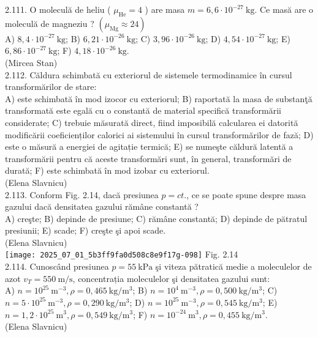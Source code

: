 2.111. O moleculă de heliu ( $\mu_{\mathrm{He}}=4$ ) are masa $m=6,6 \cdot 10^{-27} \mathrm{~kg}$. Ce masă are o moleculă de magneziu ? $\left(\mu_{\mathrm{Mg}} \approx 24\right)$\\ A) $8,4 \cdot 10^{-27} \mathrm{~kg}$; B) $6,21 \cdot 10^{-26} \mathrm{~kg}$; C) $3,96 \cdot 10^{-26} \mathrm{~kg}$; D) $4,54 \cdot 10^{-27} \mathrm{~kg}$; E) $6,86 \cdot 10^{-27} \mathrm{~kg}$; F) $4,18 \cdot 10^{-26} \mathrm{~kg}$.\\ (Mircea Stan)\\

2.112. Căldura schimbată cu exteriorul de sistemele termodinamice în cursul transformărilor de stare:\\ A) este schimbată în mod izocor cu exteriorul; B) raportată la masa de substanţă transformată este egală cu o constantă de material specifică transformării considerate; C) trebuie măsurată direct, fiind imposibilă calcularea ei datorită modificării coeficienților calorici ai sistemului în cursul transformărilor de fază; D) este o măsură a energiei de agitație termică; E) se numeşte căldură latentă a transformării pentru că aceste transformări sunt, în general, transformări de durată; F) este schimbată în mod izobar cu exteriorul.\\ (Elena Slavnicu)\\

2.113. Conform Fig. 2.14, dacă presiunea $p=ct.$, ce se poate spune despre masa gazului dacă densitatea gazului rămâne constantă ?\\ A) creşte; B) depinde de presiune; C) rămâne constantă; D) depinde de pătratul presiunii; E) scade; F) creşte şi apoi scade.\\ (Elena Slavnicu)\\ \texttt{[image: 2025\_07\_01\_5b3ff9fa0d508c8e9f17g-098]} Fig. 2.14\\

2.114. Cunoscând presiunea $p=55 \mathrm{~kPa}$ şi viteza pătratică medie a moleculelor de azot $v_{T}=550 \mathrm{~m} / \mathrm{s}$, concentrația moleculelor şi densitatea gazului sunt:\\ A) $n=10^{25} \mathrm{~m}^{-3} , \rho=0,465 \mathrm{~kg} / \mathrm{m}^{3}$; B) $n=10^{4} \mathrm{~m}^{-3} , \rho=0,500 \mathrm{~kg} / \mathrm{m}^{3}$; C) $n=5 \cdot 10^{25} \mathrm{~m}^{-3} , \rho=0,290 \mathrm{~kg} / \mathrm{m}^{3}$; D) $n=10^{25} \mathrm{~m}^{-3} , \rho=0,545 \mathrm{~kg} / \mathrm{m}^{3}$; E) $n=1,2 \cdot 10^{25} \mathrm{~m}^{3} , \rho=0,549 \mathrm{~kg} / \mathrm{m}^{3}$; F) $n=10^{-24} \mathrm{~m}^{3} , \rho=0,455 \mathrm{~kg} / \mathrm{m}^{3}$.\\ (Elena Slavnicu)\\

